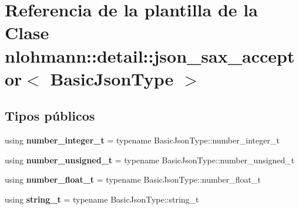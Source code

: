 \hypertarget{classnlohmann_1_1detail_1_1json__sax__acceptor}{}\section{Referencia de la plantilla de la Clase nlohmann\+:\+:detail\+:\+:json\+\_\+sax\+\_\+acceptor$<$ Basic\+Json\+Type $>$}
\label{classnlohmann_1_1detail_1_1json__sax__acceptor}
\subsection*{Tipos públicos}
\begin{DoxyCompactItemize}
\item 
\mbox{\label{classnlohmann_1_1detail_1_1json__sax__acceptor_a41876b17c0e8bdb55580eaf5e4e2ded8}} 
using {\bfseries number\+\_\+integer\+\_\+t} = typename Basic\+Json\+Type\+::number\+\_\+integer\+\_\+t
\item 
\mbox{\label{classnlohmann_1_1detail_1_1json__sax__acceptor_ae07454608ea6f3cfb765f95e3c850043}} 
using {\bfseries number\+\_\+unsigned\+\_\+t} = typename Basic\+Json\+Type\+::number\+\_\+unsigned\+\_\+t
\item 
\mbox{\label{classnlohmann_1_1detail_1_1json__sax__acceptor_a5502f483fc60a1bcd73e0e46b6ab36e4}} 
using {\bfseries number\+\_\+float\+\_\+t} = typename Basic\+Json\+Type\+::number\+\_\+float\+\_\+t
\item 
\mbox{\label{classnlohmann_1_1detail_1_1json__sax__acceptor_a3a8078bbf865ec355106f6048241609a}} 
using {\bfseries string\+\_\+t} = typename Basic\+Json\+Type\+::string\+\_\+t
\end{DoxyCompactItemize}
